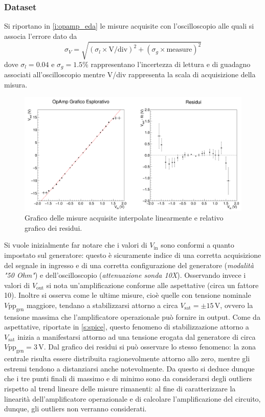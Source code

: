 \documentclass[a4paper,11pt]{article} %
\begin{document}
\subsubsection{Dataset}
Si riportano in  \autoref{i:opamp_eda} le misure acquisite con l'oscilloscopio alle quali si associa l'errore dato da
\begin{equation}\label{e:osc}
	\sigma_{V} = \sqrt{ (\sigma_{l}\times\text{V/div})^2 + (\sigma_{g}\times\text{measure})^2 }
\end{equation}
\noindent dove $\sigma_{l}=0.04$ e $\sigma_{g}=1.5\%$ rappresentano l'incertezza di lettura e di guadagno associati
all'oscilloscopio mentre V/div rappresenta la scala di acquisizione della misura.

\begin{figure}[H]
	\centering
	\includegraphics[width=\linewidth]{../Plots/Report_Plots/opamp_plot_alldata_eda.png}
	\caption{\small Grafico delle misure acquisite interpolate linearmente e relativo grafico dei residui.}
	\label{i:opamp_eda}
\end{figure}

\noindent  Si vuole inizialmente far notare che i valori di $V_{\text{in}}$ sono conformi a quanto impostato sul
generatore: questo è sicuramente indice di una corretta acquisizione del segnale in ingresso e di una corretta
configurazione del generatore (\textit{modalità "50 Ohm"}) e dell'oscilloscopio (\textit{attenuazione sonda 10X}).
Osservando invece i valori di $V_{\text{out}}$ si nota un'amplificazione conforme alle aspettative (circa un fattore
10). Inoltre si osserva come le ultime misure, cioè quelle con tensione nominale $V\text{pp}_{\text{gen}}$ maggiore,
tendano a stabilizzarsi attorno a circa $V_{\text{sat}}=\pm15\,\si{\volt}$, ovvero la tensione massima che
l'amplificatore operazionale può fornire in output. Come da aspettative, riportate in \autoref{s:spice}, questo fenomeno
di stabilizzazione attorno a $V_{\text{sat}}$ inizia a manifestarsi attorno ad una tensione erogata dal generatore di
circa $V\text{pp}_{\text{gen}}=3\,\si{\volt}$. Dal grafico dei residui si può osservare lo stesso fenomeno: la zona
centrale risulta essere distribuita ragionevolmente attorno allo zero, mentre gli estremi tendono a distanziarsi anche
notevolmente. Da questo si deduce dunque che i tre punti finali di massimo e di minimo sono da considerarsi degli
outliers rispetto al trend lineare delle misure rimanenti: al fine di caratterizzare la linearità dell'amplificatore
operazionale e di calcolare l'amplificazione del circuito, dunque, gli outliers non verranno considerati.
\end{document}
